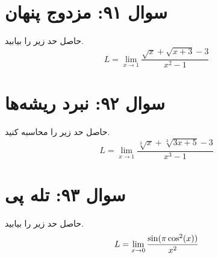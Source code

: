 \documentclass[12pt]{article}
\begin{document}
\vspace{1cm}
\hrulefill
\vspace{1cm}
\section*{سوال ۹۱: مزدوج پنهان}
حاصل حد زیر را بیابید.
\begin{displaymath}
	 L = \lim_{x \to 1} \frac{\sqrt{x} + \sqrt{x+3} - 3}{x^2 - 1}
\end{displaymath}



\vspace{1cm}
\hrulefill
\vspace{1cm}

\section*{سوال ۹۲: نبرد ریشه‌ها}
حاصل حد زیر را محاسبه کنید.
\begin{displaymath}
 L = \lim_{x \to 1} \frac{\sqrt[3]{x} + \sqrt[3]{3x+5} - 3}{x^3 - 1}
\end{displaymath}


\vspace{1cm}
\hrulefill
\vspace{1cm}

\section*{سوال ۹۳: تله پی}
حاصل حد زیر را بیابید.
\begin{displaymath}
	\Large L = \lim_{x \to 0} \frac{\sin(\pi \cos^2(x))}{x^2}
\end{displaymath}



\vspace{1cm}
\hrulefill
\vspace{1cm}

\end{document}
